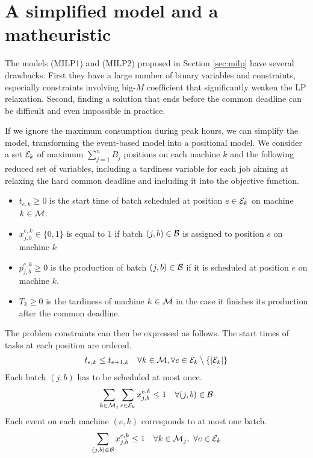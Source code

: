 \section{A simplified model and a matheuristic}
\label{sec:simple}

The models (MILP1) and (MILP2) proposed in Section \ref{sec:milp} have
several drawbacks. First they have a large number of binary variables
and constraints, especially constraints involving big-$M$ coefficient
that significantly weaken the LP relaxation. Second, finding a
solution that ends before the common deadline can be difficult and
even impossible in practice.

If we ignore the maximum consumption during peak hours, we can
simplify the model, transforming the event-based model into a
positional model.  We consider a set ${\cal E}_k$ of maximum
$\sum_{j=1}^nB_j$ positions on each machine $k$ and the following
reduced set of variables, including a tardiness variable for each job
aiming at relaxing the hard common deadline and including it into the
objective function.
\begin{itemize}
\item $t_{e,k}\geq 0$ is the start time of batch scheduled at position
  $e\in{\cal E}_k$ on machine $k\in{\cal M}$.
\item $x_{j,b}^{e,k}\in\{0,1\}$ is equal to $1$ if batch
  $(j,b)\in{\cal B}$ is assigned to position $e$ on machine $k$
\item $p_{j,b}^{e,k}\geq 0$ is the production of batch $(j,b)\in{\cal
  B}$ if it is scheduled at position $e$ on machine $k$.
\item $T_k\geq 0$ is the tardiness of machine $k\in{\cal M}$ in the
  case it finishes its production after the common deadline.
\end{itemize}
The problem constraints can then be expressed as follows.  The start
times of tasks at each position are ordered.
\begin{eqnarray}
t_{e,k}\leq t_{e+1,k}\quad\forall k\in{\cal M},\forall e\in{\cal
  E}_k\setminus\{|{\cal E}_k|\}\label{ct:simpl:1}
\end{eqnarray}
Each batch $(j,b)$ has to be scheduled at most once.
\begin{eqnarray}
\sum_{ k\in{\cal M}_j}\sum_{e\in{\cal E}_k}x_{j,b}^{e,k}\leq 1 \quad
\forall (j,b)\in{\cal B}
\end{eqnarray}
Each event on each machine $(e,k)$ corresponds to at most one batch.
\begin{eqnarray}
\sum_{(j,b)\in{\cal B}} x_{j,b}^{e,k}\leq 1 \quad \forall k\in{\cal
  M}_j,\ \forall e\in{\cal E}_k
\end{eqnarray}
